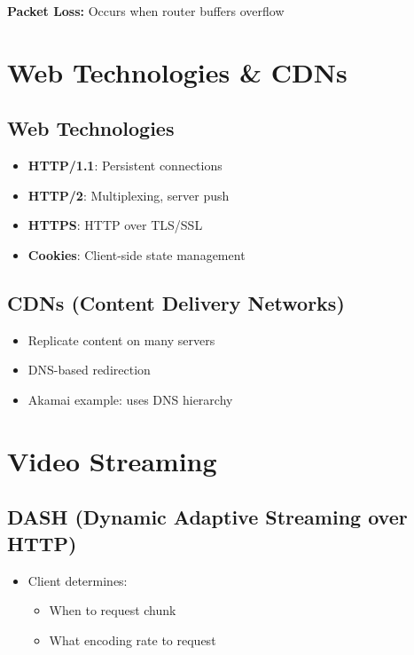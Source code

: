 \documentclass[9pt]{extarticle}
\begin{document}
\begin{multicols*}{3}
\textbf{Packet Loss:} Occurs when router buffers overflow
{\color{sectioncolor}\section*{\centering Web Technologies \& CDNs}}
{\color{subsectioncolor}\subsection*{Web Technologies}}
\begin{itemize}
\item \textbf{HTTP/1.1}: Persistent connections
\item \textbf{HTTP/2}: Multiplexing, server push
\item \textbf{HTTPS}: HTTP over TLS/SSL
\item \textbf{Cookies}: Client-side state management
\end{itemize}
{\color{subsectioncolor}\subsection*{CDNs (Content Delivery Networks)}}
\begin{itemize}
\item Replicate content on many servers
\item DNS-based redirection
\item Akamai example: uses DNS hierarchy
\end{itemize}
{\color{sectioncolor}\section*{\centering Video Streaming}}
{\color{subsectioncolor}\subsection*{DASH (Dynamic Adaptive Streaming over HTTP)}}
\begin{itemize}
\item Client determines:
\begin{itemize}
\item When to request chunk
\item What encoding rate to request

\end{itemize}
\end{itemize}
\end{multicols*}
\end{document}
